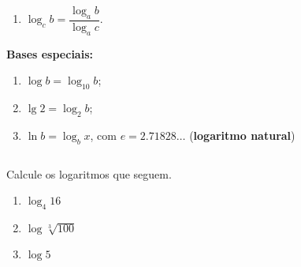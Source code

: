 \begin{frame}
\begin{columns}[onlytextwidth]
\begin{column}{0.49\textwidth}
\begin{highlight}
\begin{enumerate}
          \item $\log_{c}{b} = \dfrac{\log_{a}{b}}{\log_{a}{c}}$.
        \end{enumerate}
      \end{highlight}
      \begin{highlight}
        \textbf{Bases especiais:}
        \begin{enumerate}
          \item $\log{b}=\log_{10}{b}$;
          \item $\lg{2}=\log_{2}{b}$;
          \item $\ln{b} = \log_{b}{x}$, com $e=2.71828\dots$
          (\textbf{logaritmo natural})
        \end{enumerate}
      \end{highlight}
    \end{column}
  \end{columns}
\end{frame}

\begin{frame}
  \begin{columns}[onlytextwidth]
    \begin{column}{0.49\textwidth}\vspace{-0.55cm}
      \begin{example}
        Calcule os logaritmos que seguem.
      \end{example}
      \begin{enumerate}
        \item $\log_{4}{16}$
        \item $\log{\sqrt[3]{100}}$
        \item $\log{5}$
      \end{enumerate}
    \end{column}
    \begin{column}{0.49\textwidth}
    \end{column}
  \end{columns}
\end{frame}


